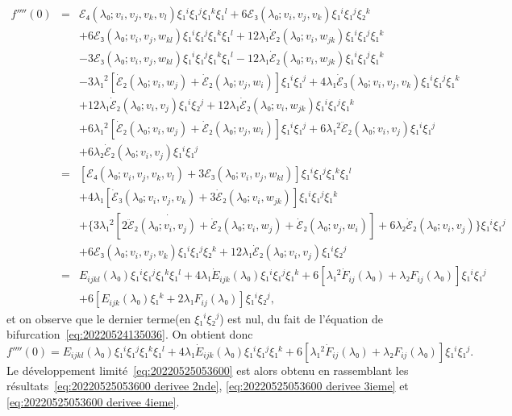 \documentclass[12pt, final]{amsart}
\theoremstyle{definition}
\begin{document}
\begin{eqnarray*}
 f''''(0) & = & ℰ₄(λ₀ ; v_i, v_j, v_k {, v_l} ) ξ₁^i
 ξ₁^j ξ₁^k ξ₁^l + 6ℰ₃(λ₀ ; v_i, v_j, v_k) ξ₁^i
 ξ₁^j ξ₂^k\\
 & & + 6ℰ₃(λ₀ ; v_i, v_j, w_{k l})
 ξ₁^i ξ₁^j ξ₁^k ξ₁^l + 12 λ₁ \dot{ℰ}₂
 (λ₀ ; v_{i }, w_{j k}) ξ₁^i ξ₁^j ξ₁^k\\
 & & - 3ℰ₃(λ₀ ; v_i, v_j, w_{k l})
 ξ₁^i ξ₁^j ξ₁^k ξ₁^l - 12 λ₁ \dot{ℰ}₂
 (λ₀ ; v_i, w_{j k}) ξ₁^i ξ₁^j ξ₁^k\\
 & & - 3 λ₁^2 [\dot{ℰ}₂(λ₀ ; v_i, w_j)
 + \dot{ℰ}₂(λ₀ ; v_j, w_i)] ξ₁^i ξ₁^j + 4 λ₁
 \dot{ℰ}₃(λ₀ ; v_i, v_j, v_k) ξ₁^i ξ₁^j ξ₁^k\\
 & & + 12 λ₁ \dot{ℰ}₂(λ₀ ; v_i,
 v_j) ξ₁^i ξ₂^j + 12 λ₁ \dot{ℰ}₂(λ₀ ;
 v_i, w_{j k}) ξ₁^i ξ₁^j ξ₁^k\\
 & & + 6 λ₁^2 [\dot{ℰ}₂(λ₀ ; v_i,
 w_j) + \dot{ℰ}₂(λ₀ ; v_j, w_i)] ξ₁^i ξ₁^j + 6
 λ₁^2 \ddot{ℰ}₂(λ₀ ; v_i, v_j) ξ₁^i ξ₁^j\\
 & & + 6 λ₂ \dot{ℰ}₂(λ₀ ; v_i, v_j)
 ξ₁^i ξ₁^j\\
 & = & \left[ ℰ₄(λ₀ ; v_i, v_j, v_k {, v_l} ) +
 3ℰ₃(λ₀ ; v_i, v_j, w_{k l}) \right] ξ₁^i
 ξ₁^j ξ₁^k ξ₁^l\\
 & & + 4 λ₁ [\dot{ℰ}₃(λ₀ ; v_i, v_j,
 v_k) + 3 \dot{ℰ}₂(λ₀ ; v_i, w_{j k})] ξ₁^i
 ξ₁^j ξ₁^k\\
 & & + \{ 3 λ₁^2 [\dot{2 \ddot{ℰ}₂
 (λ₀ ; v_i, v_j) + \dot{ℰ}}₂(λ₀ ; v_i, w_j) +
 \dot{ℰ}₂(λ₀ ; v_j, w_i)] + 6 λ₂
 \dot{ℰ}₂(λ₀ ; v_i, v_j) \} ξ₁^i ξ₁^j\\
 & & + 6ℰ₃(λ₀ ; v_i, v_j, v_k) ξ₁^i ξ₁^j
 ξ₂^k + 12 λ₁ \dot{ℰ}₂(λ₀ ; v_i, v_j)
 ξ₁^i ξ₂^j\\
 & = & E_{i j k l}(λ₀) ξ₁^i ξ₁^j
 ξ₁^k ξ₁^l + 4 λ₁ \dot{E}_{i j k}
 (λ₀) ξ₁^i ξ₁^j ξ₁^k + 6 [λ₁^2 \dot{F}_{i
  j}(λ₀) + λ₂ F_{i j}(λ₀)]
 ξ₁^i ξ₁^j\\
 & & + 6 [E_{i j k}(λ₀) ξ₁^k + 2
 λ₁ F_{i j}(λ₀)] ξ₁^i ξ₂^j,
\end{eqnarray*}
et on observe que le dernier terme(en \(ξ₁^i ξ₂^j\)) est nul, du fait de l'équation de bifurcation~\eqref{eq:20220524135036}. On obtient donc
\begin{equation}
 \label{eq:20220525053600 derivee 4ieme} f''''(0) = E_{i j k
  l}(λ₀) ξ₁^i ξ₁^j ξ₁^k ξ₁^l + 4 λ₁
 \dot{E}_{i j k}(λ₀) ξ₁^i ξ₁^j ξ₁^k + 6
 [λ₁^2 \dot{F}_{i j}(λ₀) + λ₂ F_{i
  j}(λ₀)] ξ₁^i ξ₁^j .
\end{equation}
Le développement limité~\eqref{eq:20220525053600} est alors obtenu en rassemblant les résultats~\eqref{eq:20220525053600 derivee 2nde}, \eqref{eq:20220525053600 derivee 3ieme} et \eqref{eq:20220525053600 derivee 4ieme}.
\end{document}
